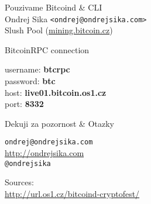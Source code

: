 \documentclass{beamer}
\begin{document}
\Large
\begin{frame}

    {\huge Pouzivame Bitcoind \& CLI}\\
    \vspace{7mm}
    {\LARGE Ondrej Sika \lstinline|<ondrej@ondrejsika.com>|}\\
    \vspace{7mm}
    {\Large Slush Pool (\url{mining.bitcoin.cz})}\\

\end{frame}

\begin{frame}

    {\huge BitcoinRPC connection}\\

    \vspace{5mm}

    username: {\bf btcrpc}\\
    password: {\bf btc}\\
    host:     {\bf live01.bitcoin.os1.cz}\\
    port:     {\bf 8332}\\

\end{frame}

\begin{frame}

    {\huge Dekuji za pozornost \& Otazky}\\

    \vspace{1cm}

    \texttt{ondrej@ondrejsika.com}\\
    \url{http://ondrejsika.com}\\
    \texttt{@ondrejsika}\\

    \vspace{1cm}

    Sources:\\
    \url{http://url.os1.cz/bitcoind-cryptofest/}
\end{frame}
\end{document}
